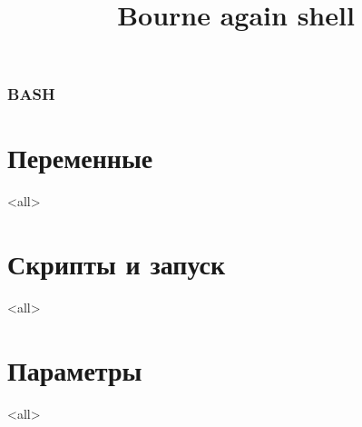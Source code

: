 
\title[bash]{Bourne again shell}




\begin{frame}
	\frametitle{BASH}
	\titlepage
	\vspace{-0.5cm}
	\begin{center}
	\end{center}
\end{frame}

\begin{frame}
	\tableofcontents
\end{frame}




\section{Переменные}

\mode<all>{}

\section[Runtime]{Скрипты и запуск}

\mode<all>{}

\section{Параметры}

\mode<all>{}





